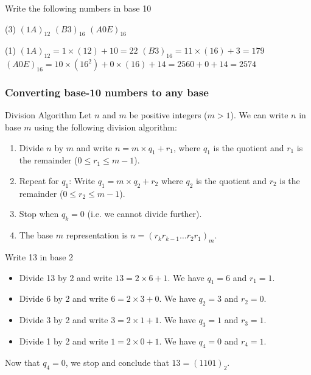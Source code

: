 \begin{frame}[t]
\begin{ex}
Write the following numbers in base 10
\begin{tasks}(3)
\task $(1A)_{12}$
\task $(B3)_{16}$
\task $(A0E)_{16}$
\end{tasks}
\end{ex}
\begin{sol}
\begin{tasks}(1)
\task $(1A)_{12} = 1 \times (12) + 10 = 22$
\task $(B3)_{16} = 11 \times (16) + 3 = 179$
\task $(A0E)_{16} = 10 \times (16^2) + 0 \times (16) + 14 = 2560 + 0 + 14 = 2574$
\end{tasks}
\end{sol}
\end{frame}

\begin{frame}
\frametitle{Converting base-10 numbers to any base}
\begin{defn}{Division Algorithm}{}
Let $n$ and $m$ be positive integers ($m > 1$). We can write $n$ in base $m$ using the following division algorithm:
\begin{enumerate}
\item Divide $n$ by $m$ and write $n = m \times q_1 + r_1$, where $q_1$ is the quotient and $r_1$ is the remainder ($0 \leq r_1 \leq m-1$).
\item Repeat for $q_1$: Write $q_1 = m \times q_2 + r_2$ where $q_2$ is the quotient and $r_2$ is the remainder ($0 \le r_2 \le m-1$).
\item Stop when $q_k = 0$ (i.e. we cannot divide further).
\item The base $m$ representation is $n = (r_k r_{k-1} \ldots r_2 r_1)_m$.
\end{enumerate}
\end{defn}
\end{frame}


\begin{frame}[t]
\begin{ex}
Write 13 in base 2
\end{ex}
\begin{sol}
\begin{itemize}
\item Divide 13 by 2 and write $13 = 2 \times 6 + 1$. We have $q_1 = 6$ and $r_1 = 1$.
\item Divide 6 by 2 and write $6 = 2 \times 3 + 0$. We have $q_2 = 3$ and $r_2 = 0$.
\item Divide 3 by 2 and write $3 = 2 \times 1 + 1$. We have $q_3 = 1$ and $r_3 = 1$.
\item Divide 1 by 2 and write $1 = 2 \times 0 + 1$. We have $q_4 = 0$ and $r_4 = 1$.
\end{itemize}
Now that $q_4 = 0$, we stop and conclude that $13 = (1101)_2$.
\end{sol}
\end{frame}

